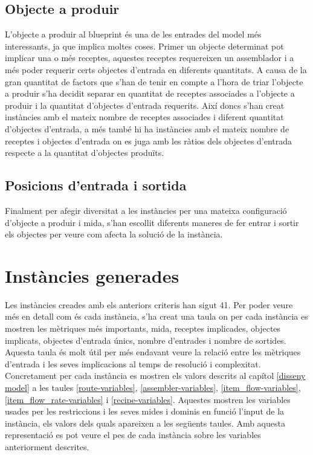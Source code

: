 \subsection{Objecte a produir}
L'objecte a produir al blueprint és una de les entrades del model més interessants, ja que implica moltes coses. Primer un objecte determinat pot implicar una o més receptes, aquestes receptes requereixen un assemblador i a més poder requerir certs objectes d'entrada en diferents quantitats. A causa de la gran quantitat de factors que s'han de tenir en compte a l'hora de triar l'objecte a produir s'ha decidit separar en quantitat de receptes associades a l'objecte a produir i la quantitat d'objectes d'entrada requerits. Així doncs s'han creat instàncies amb el mateix nombre de receptes associades i diferent quantitat d'objectes d'entrada, a més també hi ha instàncies amb el mateix nombre de receptes i objectes d'entrada on es juga amb les ràtios dels objectes d'entrada respecte a la quantitat d'objectes produïts.\\

\subsection{Posicions d'entrada i sortida}
Finalment per afegir diversitat a les instàncies per una mateixa configuració d'objecte a produir i mida, s'han escollit diferents maneres de fer entrar i sortir els objectes per veure com afecta la solució de la instància.

\section{Instàncies generades}
Les instàncies creades amb els anteriors criteris han sigut 41. Per poder veure més en detall com és cada instància, s'ha creat una taula on per cada instància es mostren les mètriques més importants, mida, receptes implicades, objectes implicats, objectes d'entrada únics, nombre d'entrades i nombre de sortides. Aquesta taula és molt útil per més endavant veure la relació entre les mètriques d'entrada i les seves implicacions al temps de resolució i complexitat.\\
Concretament per cada instància es mostren els valors descrits al capítol \ref{disseny model} a les taules \ref{route-variables}, \ref{assembler-variables}, \ref{item_flow-variables}, \ref{item_flow_rate-variables} i \ref{recipe-variables}. Aquestes mostren les variables usades per les restriccions i les seves mides i dominis en funció l'input de la instància, els valors dels quals apareixen a les següents taules. Amb aquesta representació es pot veure el pes de cada instància sobre les variables anteriorment descrites.

